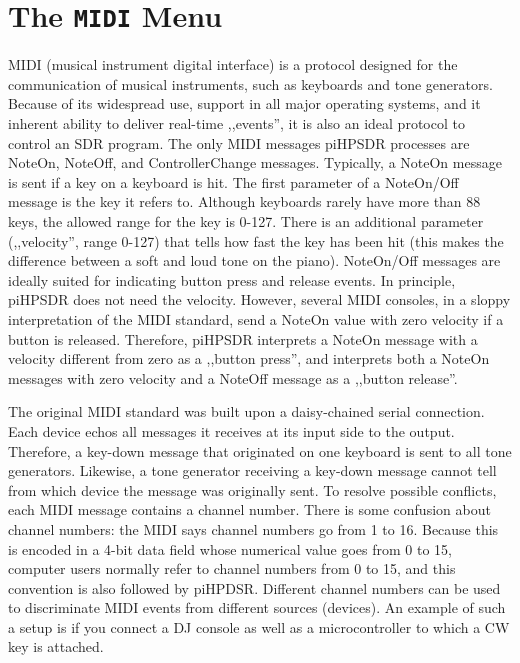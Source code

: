 \documentclass[12pt]{book}
\begin{document}
\section{The \texttt{MIDI} Menu}
\label{sec:midimenu}
MIDI (musical instrument digital interface) is a protocol designed for the communication of
musical instruments, such as keyboards and tone generators. Because of its widespread use,
support in all major operating systems, and it inherent ability to deliver real-time ,,events'',
it is also an ideal protocol to control an SDR program. The only MIDI messages piHPSDR processes
are NoteOn, NoteOff, and ControllerChange messages. Typically, a NoteOn message is sent if
a key on a keyboard is hit. The first parameter of a NoteOn/Off message is the key
it refers to. Although keyboards rarely have more than 88 keys, the allowed range for
the key is 0-127. There is an additional parameter (,,velocity'', range 0-127) that tells how
fast the key has been hit (this makes the difference between a soft and loud tone on the piano).
NoteOn/Off messages are ideally suited for indicating button press and release events. In principle,
piHPSDR does not need the velocity. However, several MIDI consoles, in a sloppy interpretation of
the MIDI standard, send a NoteOn value with zero velocity if a button is released. Therefore,
piHPSDR interprets a NoteOn message with a velocity different from zero as a ,,button press'',
and interprets both a NoteOn messages with zero velocity and a NoteOff message as a ,,button release''.

The original MIDI standard was built upon a daisy-chained serial connection. Each device
echos all messages it receives at its input side to the output. Therefore, a key-down
message that originated on one keyboard is sent to all tone generators. Likewise, a tone
generator receiving a key-down message cannot tell from which device the message
was originally sent. To resolve possible conflicts, each MIDI message contains a channel
number. There is some confusion about channel numbers: the MIDI says channel numbers
go from 1 to 16. Because this is encoded in a 4-bit data field whose numerical value
goes from 0 to 15, computer users normally refer to channel numbers from 0 to 15,
and this convention is also followed by piHPDSR. Different channel numbers can be used
to discriminate MIDI events from different sources (devices). An example of such a setup
is if you connect a DJ console as well as a microcontroller to which a CW key is attached.
\end{document}
